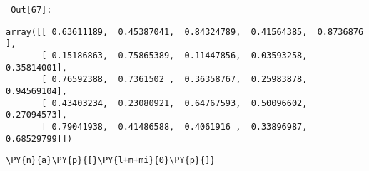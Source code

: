         {\par%
        \vspace{-1\smallerfontscale}%
        \noindent%
        \begin{minipage}{\cellleftmargin}%
    \hfill%
    {\smaller%
    \tt%
    \color{nbframe-out-prompt}%
    Out[67]:}%
    \hspace{\inputpadding}%
    \hspace{0em}%
    \hspace{3pt}%
    \end{minipage}%
        }%
    \begin{addmargin}[\cellleftmargin]{0em}%
    {\smaller%
    \vspace{-1\smallerfontscale}%
    
    
    
    \begin{verbatim}
array([[ 0.63611189,  0.45387041,  0.84324789,  0.41564385,  0.8736876 ],
       [ 0.15186863,  0.75865389,  0.11447856,  0.03593258,  0.35814001],
       [ 0.76592388,  0.7361502 ,  0.36358767,  0.25983878,  0.94569104],
       [ 0.43403234,  0.23080921,  0.64767593,  0.50096602,  0.27094573],
       [ 0.79041938,  0.41486588,  0.4061916 ,  0.33896987,  0.68529799]])
    \end{verbatim}

    
}%
    \end{addmargin}%

{\par%
\vspace{-1\baselineskip}%
}%
\begin{notebookcell}[68]%
\begin{addmargin}[\cellleftmargin]{0em}%
{\smaller%
\par%
%
\vspace{-1\smallerfontscale}%
\begin{Verbatim}[commandchars=\\\{\}]
\PY{n}{a}\PY{p}{[}\PY{l+m+mi}{0}\PY{p}{]}
\end{Verbatim}
%
\par%
\vspace{-1\smallerfontscale}}%
\end{addmargin}
\end{notebookcell}

\par\vspace{1\smallerfontscale}%
    

